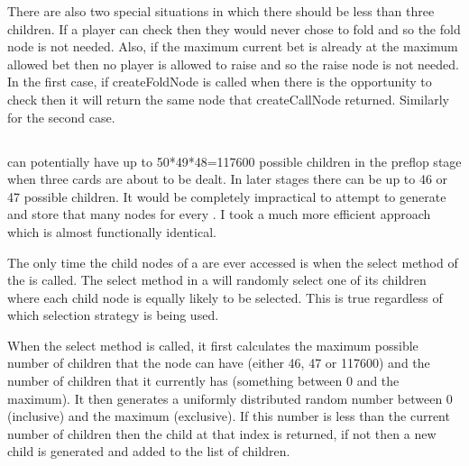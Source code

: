 
There are also two special situations in which there should be less than three children. If a player can check then they would never chose to fold and so the fold node is not needed. Also, if the maximum current bet is already at the maximum allowed bet then no player is allowed to raise and so the raise node is not needed. In the first case, if createFoldNode is called when there is the opportunity to check then it will return the same node that createCallNode returned. Similarly for the second case. 



\subsection{\chance}								%

\chances can potentially have up to 50*49*48=117600 possible children in the preflop stage when three cards are about to be dealt. In later stages there can be up to 46 or 47 possible children. It would be completely impractical to attempt to generate and store that many nodes for every \chance. 
I took a much more efficient approach which is almost functionally identical.

The only time the child nodes of a \chance are ever accessed is when the select method of the \chance is called. The select method in a \chance will randomly select one of its children where each child node 
is equally likely to be selected.
This is true regardless of which selection strategy is being used.

When the select method is called, it first calculates the maximum possible number of children that the node can have (either 46, 47 or 117600) and the number of children that it currently has (something between 0 and the maximum). It then generates a uniformly distributed random number between 0 (inclusive) and the maximum (exclusive). If this number is less than the current number of children then the child at that index is returned, if not then a new child is generated and added to the list of children. 


